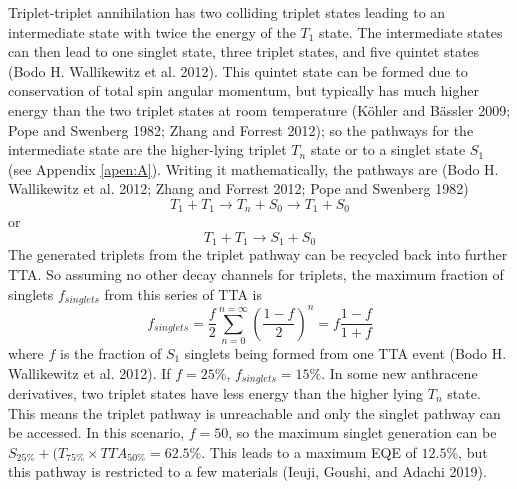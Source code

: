 \documentclass[
  letterpaper,
  DIV=11,
  numbers=noendperiod,
  oneside]{scrreprt}
\begin{document}
Triplet-triplet annihilation has two colliding triplet states leading to
an intermediate state with twice the energy of the \(T_1\) state. The
intermediate states can then lead to one singlet state, three triplet
states, and five quintet states (Bodo H. Wallikewitz et al. 2012). This
quintet state can be formed due to conservation of total spin angular
momentum, but typically has much higher energy than the two triplet
states at room temperature (Köhler and Bässler 2009; Pope and Swenberg
1982; Zhang and Forrest 2012); so the pathways for the intermediate
state are the higher-lying triplet \(T_n\) state or to a singlet state
\(S_1\) (see Appendix \protect\hyperlink{apen:A}{{[}apen:A{]}}). Writing
it mathematically, the pathways are (Bodo H. Wallikewitz et al. 2012;
Zhang and Forrest 2012; Pope and Swenberg 1982) \[\label{eq:1} 
    T_1 + T_1 \rightarrow T_n + S_0 \rightarrow T_1+S_0\] or
\[\label{eq:2}
    T_1 + T_1 \rightarrow S_1 + S_0\] The generated triplets from the
triplet pathway can be recycled back into further TTA. So assuming no
other decay channels for triplets, the maximum fraction of singlets
\(f_{singlets}\) from this series of TTA is
\[f_{singlets} = \frac{f}{2} \sum_{n=0}^{n=\infty} \left(\frac{1-f}{2} \right)^n = f\frac{1-f}{1+f}\]
where \(f\) is the fraction of \(S_1\) singlets being formed from one
TTA event (Bodo H. Wallikewitz et al. 2012). If \(f=25\%\),
\(f_{singlets}=15\%\). In some new anthracene derivatives, two triplet
states have less energy than the higher lying \(T_n\) state. This means
the triplet pathway is unreachable and only the singlet pathway can be
accessed. In this scenario, \(f=50\), so the maximum singlet generation
can be \(S_{25\%}+(T_{75\%}\times TTA_{50\%} = 62.5\%\). This leads to a
maximum EQE of \(12.5\%\), but this pathway is restricted to a few
materials (Ieuji, Goushi, and Adachi 2019).
\end{document}
